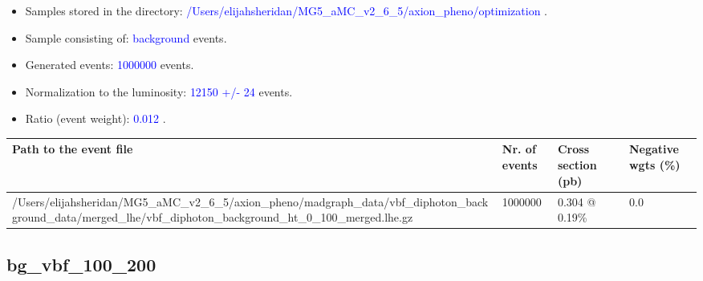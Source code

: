 \documentclass[a4paper, 10pt]{article}
\begin{document}
\begin{itemize}
  \item Samples stored in the directory: \textcolor{blue}{/\-Users/\-elijahsheridan/\-MG5\_aMC\_v2\_6\_5/\-axion\_pheno/\-optimization} .
   \item Sample consisting of: \textcolor{blue}{background}  events.
   \item Generated events: \textcolor{blue}{1000000 }  events.
   \item Normalization to the luminosity: \textcolor{blue}{12150}\textcolor{blue}{ +/\-- }\textcolor{blue}{24 }  events.
   \item Ratio (event weight): \textcolor{blue}{0.012 } .  
 
\end{itemize}
\begin{table}[H]
  \begin{center}
    \begin{tabular}{|m{55.0mm}|m{25.0mm}|m{30.0mm}|m{30.0mm}|}
      \hline
      {\cellcolor{yellow}         Path to the event file}& {\cellcolor{yellow}         Nr. of events}& {\cellcolor{yellow}         Cross section (pb)}& {\cellcolor{yellow}         Negative wgts (\%)}\\
      \hline
      {\cellcolor{white}          /\-Users/\-elijahsheridan/\-MG5\_aMC\_v2\_6\_5/\-axion\_pheno/\-madgraph\_data/\-vbf\_diphoton\_background\_data/\-merged\_lhe/\-vbf\_diphoton\_background\_ht\_0\_100\_merged.lhe.gz}& {\cellcolor{white}          1000000}& {\cellcolor{white}          0.304 @ 0.19\%}& {\cellcolor{white}          0.0}\\
\hline
    \end{tabular}
  \end{center}
\end{table}

\subsection{ bg\_vbf\_100\_200}
\end{document}
